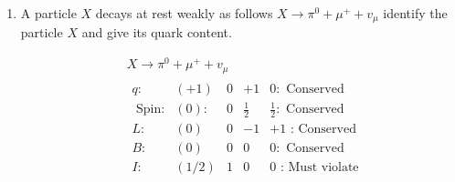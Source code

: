 \begin{enumerate}
\begin{answer}
\begin{align*}
		&\begin{array}{lllll}
		q:&+1&0&+1 & 0:\text{ Conserved}\\
		\text{Spin: }&0 & 0 & \frac{1}{2} & \frac{1}{2}: \text{ Conserved}\\
		I: & \frac{1}{2} & 1 & 0 & 0:\text{ Not Conserved}\\
		I_3: & \frac{1}{2} & 0 & 0 & 0:\text{ Not Conserved}\\
		\operatorname{Str} S:&+1 & 0 & 0 & 0: \text { Not Conserved }
		\end{array}
		\intertext{It is forbidden as electromagnetic interaction because $\Delta S \neq 0$ and also forbidden as weak interaction because there is no strangeness changing current.}
		&\text { (b) } \quad \Sigma^0 \rightarrow \Lambda+v_e+\bar{v}_e\\
		&\begin{array}{lllll}
		S:& 0 &0 & 0 & 0:\text{ Conserved}\\
		\text{Spin: }&\frac{1}{2} & \frac{1}{2} & \frac{1}{2} & \frac{1}{2}:\text{ Conserved}\\
		L_e:& 0&0&+1&-1:\text{ Conserved}\\
		B:&+1&+1& 0 &0:\text{ Conserved}\\
		I: &1 & 0 & 0 & 0:\text{ Conserved}\\
		I_3: & 1 & 0 & 0 & 0:\text{ Conserved}\\
		S:&-1 &-1 & 0 & 0:\text{ Conserved}\\
		\end{array}\\
		&\text{It is allowed as electromagnetic interaction}
		\end{align*}
	\end{answer}
	\item   A particle $X$ decays at rest weakly as follows $X \rightarrow \pi^0+\mu^{+}+v_\mu$ identify the particle $X$ and give its quark content.
			\begin{answer}
		\begin{align*}
		&X \rightarrow \pi^0+\mu^{+}+v_\mu\\
		&\begin{array}{lllll}
		q: &(+1) & 0&+1 & 0:\text{ Conserved}\\
		\text{	Spin:}& (0): & 0 & \frac{1}{2} & \frac{1}{2}:\text{ Conserved}\\
		L: &(0) &0 &-1 &+1\text{ : Conserved}\\
		B: &(0) & 0 & 0 & 0:\text{ Conserved}\\
		I: &(1 / 2) & 1 & 0 & 0\text{ : Must violate}\\

\end{array}
\end{align*}
\end{answer}
\end{enumerate}

